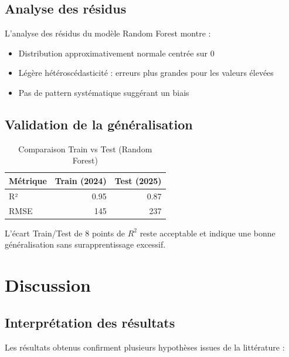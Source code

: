 \documentclass[12pt,a4paper]{article}
\begin{document}
\subsection{Analyse des résidus}

L'analyse des résidus du modèle Random Forest montre :
\begin{itemize}
    \item Distribution approximativement normale centrée sur 0
    \item Légère hétéroscédasticité : erreurs plus grandes pour les valeurs élevées
    \item Pas de pattern systématique suggérant un biais
\end{itemize}

\subsection{Validation de la généralisation}

\begin{table}[H]
\centering
\caption{Comparaison Train vs Test (Random Forest)}
\begin{tabular}{lrr}
\toprule
\textbf{Métrique} & \textbf{Train (2024)} & \textbf{Test (2025)} \\
\midrule
R² & 0.95 & 0.87 \\
RMSE & 145 & 237 \\
\bottomrule
\end{tabular}
\end{table}

L'écart Train/Test de 8 points de $R^2$ reste acceptable et indique une bonne généralisation sans surapprentissage excessif.

\section{Discussion}

\subsection{Interprétation des résultats}

Les résultats obtenus confirment plusieurs hypothèses issues de la littérature :
\end{document}

